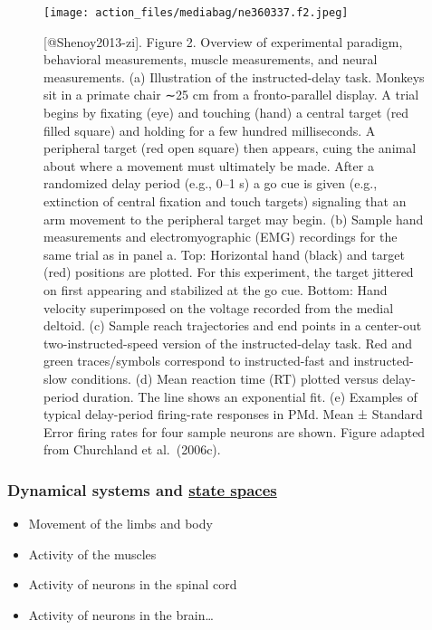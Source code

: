 \documentclass[
  letterpaper,
  DIV=11,
  numbers=noendperiod]{scrartcl}
\providecommand{\tightlist}{%
  \setlength{\itemsep}{0pt}\setlength{\parskip}{0pt}}\usepackage{longtable,booktabs,array}
\begin{document}
\begin{figure}[H]

{\centering \texttt{[image: action\_files/mediabag/ne360337.f2.jpeg]}

}

\caption{{[}@Shenoy2013-zi{]}. Figure 2. Overview of experimental
paradigm, behavioral measurements, muscle measurements, and neural
measurements. (a) Illustration of the instructed-delay task. Monkeys sit
in a primate chair ∼25 cm from a fronto-parallel display. A trial begins
by fixating (eye) and touching (hand) a central target (red filled
square) and holding for a few hundred milliseconds. A peripheral target
(red open square) then appears, cuing the animal about where a movement
must ultimately be made. After a randomized delay period (e.g., 0--1 s)
a go cue is given (e.g., extinction of central fixation and touch
targets) signaling that an arm movement to the peripheral target may
begin. (b) Sample hand measurements and electromyographic (EMG)
recordings for the same trial as in panel a. Top: Horizontal hand
(black) and target (red) positions are plotted. For this experiment, the
target jittered on first appearing and stabilized at the go cue. Bottom:
Hand velocity superimposed on the voltage recorded from the medial
deltoid. (c) Sample reach trajectories and end points in a center-out
two-instructed-speed version of the instructed-delay task. Red and green
traces/symbols correspond to instructed-fast and instructed-slow
conditions. (d) Mean reaction time (RT) plotted versus delay-period
duration. The line shows an exponential fit. (e) Examples of typical
delay-period firing-rate responses in PMd. Mean ± Standard Error firing
rates for four sample neurons are shown. Figure adapted from Churchland
et al.~(2006c).}

\end{figure}%

\subsubsection{\texorpdfstring{Dynamical systems and
\href{https://en.wikipedia.org/wiki/State-space_representation}{state
spaces}}{Dynamical systems and state spaces}}\label{dynamical-systems-and-state-spaces}

\begin{itemize}
\tightlist
\item
  Movement of the limbs and body
\item
  Activity of the muscles
\item
  Activity of neurons in the spinal cord
\item
  Activity of neurons in the brain\ldots{}
\end{itemize}
\end{document}
